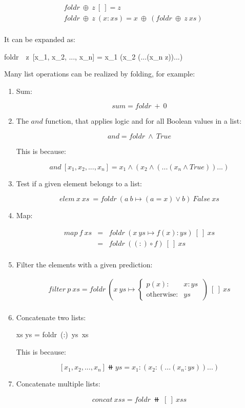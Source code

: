 \documentclass[b5paper]{article}
\begin{document}
\[
\begin{array}{l}
foldr\ \oplus\ z\ [\ ] = z \\
foldr\ \oplus\ z\ (x:xs) = x\ \oplus\ (foldr\ \oplus\ z\ xs) \\
\end{array}
\]

It can be expanded as:

\be
foldr\ \oplus\ z\ [x_1, x_2, ..., x_n] = x_1 \oplus (x_2 \oplus (...(x_n \oplus z))...)
\ee

Many list operations can be realized by folding, for example:

\begin{enumerate}
\item Sum:

\[
sum = foldr\ +\ 0
\]

\item The $and$ function, that applies logic and for all Boolean values in a list:

\[
and = foldr\ \land\ True
\]

This is because:

\[
and\ [x_1, x_2, ..., x_n] = x_1 \land (x_2 \land (...(x_n \land True))...)
\]

\item Test if a given element belongs to a list:

\[
elem\ x\ xs\ = foldr\ (a\ b \mapsto (a = x) \lor b)\ False\ xs
\]

\item Map:

\[
\begin{array}{rcl}
map\ f\ xs & = & foldr\ (x\ ys \mapsto f(x) : ys)\ [\ ]\ xs \\
           & = & foldr\ ((:) \circ f)\ [\ ]\ xs \\
\end{array}
\]

\item Filter the elements with a given prediction:

\[
\begin{array}{rl}
filter\ p\ xs = foldr\ (x\ ys \mapsto
  \begin{cases}
    p(x): & x:ys\ \\
    \text{otherwise}: & ys
  \end{cases})\ [\ ]\ xs \\
\end{array}
\]

\item Concatenate two lists:

\be
xs \doubleplus ys = foldr\ (:)\ ys\ xs
\label{eq:binary-concat}
\ee

This is because:

\[
[x_1, x_2, ..., x_n] \doubleplus ys = x_1 : (x_2 : (...(x_n : ys))...)
\]

\item Concatenate multiple lists:

\[
concat\ xss = foldr\ \doubleplus\ [\ ]\ xss
\]

\end{enumerate}
\end{document}
